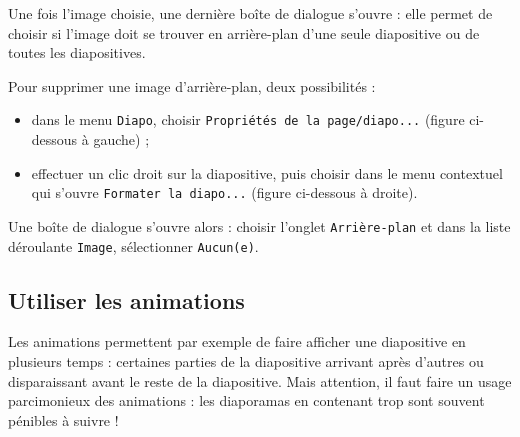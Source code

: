 
Une fois l'image choisie, une dernière boîte de dialogue s'ouvre : elle permet de choisir si l'image doit se trouver en arrière-plan d'une seule diapositive ou de toutes les diapositives.




Pour supprimer une image d'arrière-plan, deux possibilités :

\begin{itemize}
\item dans le menu \texttt{Diapo}, choisir \texttt{Propriétés de la page/diapo...} (figure ci-dessous à gauche) ;
\item effectuer un clic droit sur la diapositive, puis choisir dans le menu contextuel qui s'ouvre \texttt{Formater la diapo...} (figure ci-dessous à droite).
\end{itemize}


Une boîte de dialogue s'ouvre alors : choisir l'onglet \texttt{Arrière-plan} et dans la liste déroulante \texttt{Image}, sélectionner \texttt{Aucun(e)}.








\subsection{Utiliser les animations}\label{Presentation1effets}

Les animations permettent par exemple de faire afficher une diapositive en plusieurs temps : certaines parties de la diapositive arrivant après d'autres ou disparaissant avant le reste de la diapositive. Mais attention, il faut faire un usage parcimonieux des animations : les diaporamas en contenant trop sont souvent pénibles à suivre !

